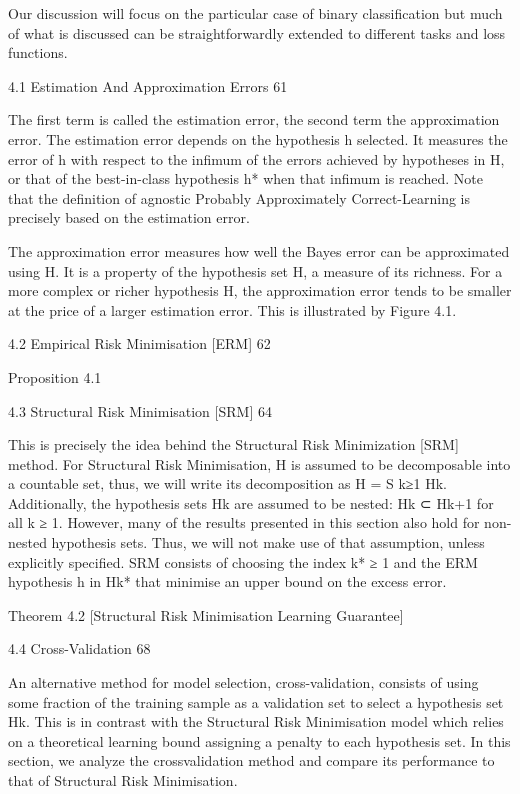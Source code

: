 Our discussion will focus on the particular case of binary classification but much of what is discussed can be straightforwardly extended to different tasks and loss functions.

4.1 Estimation And Approximation Errors 61

The first term is called the estimation error, the second term the approximation error. The estimation error depends on the hypothesis h selected. It measures the error of h with respect to the infimum of the errors achieved by hypotheses in H, or that of the best-in-class hypothesis h* when that infimum is reached. Note that the definition of agnostic Probably Approximately Correct-Learning is precisely based on the estimation error.

The approximation error measures how well the Bayes error can be approximated using H. It is a property of the hypothesis set H, a measure of its richness. For a more complex or richer hypothesis H, the approximation error tends to be smaller at the price of a larger estimation error. This is illustrated by Figure 4.1.

4.2 Empirical Risk Minimisation [ERM] 62

Proposition 4.1

4.3 Structural Risk Minimisation [SRM] 64

This is precisely the idea behind the Structural Risk Minimization [SRM] method. For Structural Risk Minimisation, H is assumed to be decomposable into a countable set, thus, we will write its decomposition as H = S k≥1 Hk. Additionally, the hypothesis sets Hk are assumed to be nested: Hk ⊂ Hk+1 for all k ≥ 1. However, many of the results presented in this section also hold for non-nested hypothesis sets. Thus, we will not make use of that assumption, unless explicitly specified. SRM consists of choosing the index k* ≥ 1 and the ERM hypothesis h in Hk* that minimise an upper bound on the excess error.

Theorem 4.2 [Structural Risk Minimisation Learning Guarantee]

4.4 Cross-Validation 68

An alternative method for model selection, cross-validation, consists of using some fraction of the training sample as a validation set to select a hypothesis set Hk. This is in contrast with the Structural Risk Minimisation model which relies on a theoretical learning bound assigning a penalty to each hypothesis set. In this section, we analyze the crossvalidation method and compare its performance to that of Structural Risk Minimisation.


